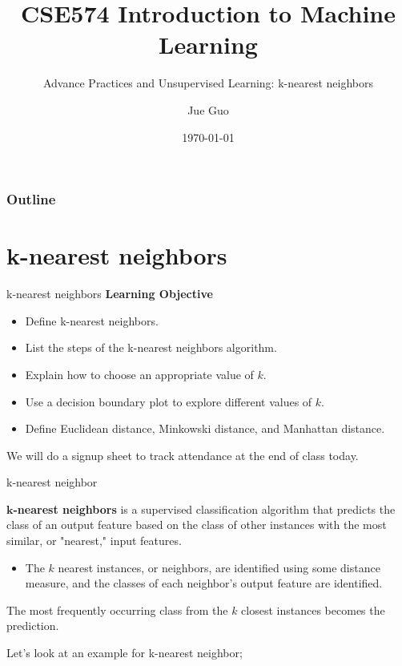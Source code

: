 \documentclass[8pt,dvipsnames]{beamer}
\title{CSE574 Introduction to Machine Learning}
\subtitle{Advance Practices and Unsupervised Learning: k-nearest neighbors}
\author{Jue Guo}
\institute{University at Buffalo}
\date{\today}
\begin{document}
\begin{frame}
	\titlepage
\end{frame}
\begin{frame}
	\frametitle{Outline}
	\tableofcontents
\end{frame}
\section{k-nearest neighbors}
\begin{frame}{k-nearest neighbors}
	\textbf{Learning Objective}
	\begin{itemize}
		\item Define k-nearest neighbors.
		\item List the steps of the k-nearest neighbors algorithm.
		\item Explain how to choose an appropriate value of \(k\).
		\item Use a decision boundary plot to explore different values of \(k\).
		\item Define Euclidean distance, Minkowski distance, and Manhattan distance.
	\end{itemize}
	We will do a signup sheet to track attendance at the end of class today.
\end{frame}

\begin{frame}{k-nearest neighbor}

	\textbf{\(\boldsymbol{k}\)-nearest neighbors} is a supervised classification algorithm that predicts the class of an output feature based on the class of other instances with the most similar, or "nearest," input features.
	\begin{itemize}
		\item  The \(k\) nearest instances, or neighbors, are identified using some distance measure, and the classes of each neighbor's output feature are identified.
	\end{itemize}
	The most frequently occurring class from the \(k\) closest instances becomes the prediction.

	Let's look at an example for k-nearest neighbor;

\end{frame}
\end{document}
